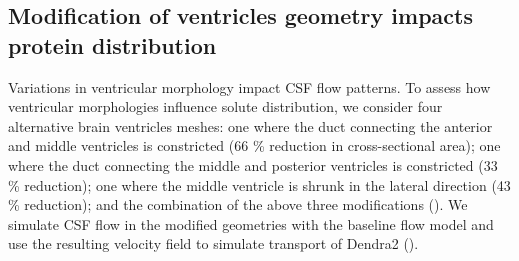 \documentclass{WileyMSP-template}
\begin{document}
\subsection{Modification of ventricles geometry impacts protein distribution}
Variations in ventricular morphology impact CSF flow patterns.
To assess how ventricular morphologies influence solute distribution,
we consider four alternative brain ventricles meshes:
one where the duct connecting the anterior and middle ventricles is constricted
(66 \% reduction in cross-sectional area);
one where the duct connecting the middle and posterior ventricles is constricted
(33 \% reduction);
one where the middle ventricle is shrunk in the lateral direction (43 \% reduction);
and the combination of the above three modifications ().
We simulate CSF flow in the modified geometries with the baseline flow model
and use the resulting velocity field to simulate transport of Dendra2
().
\end{document}
